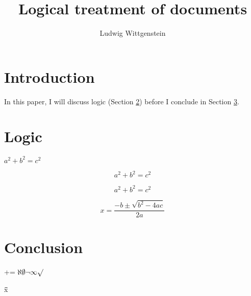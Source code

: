 \documentclass[output=paper]{langscibook}
\title{Logical treatment of documents}
\author{Ludwig Wittgenstein}
\newcommand{\macronacute}[1]{\={\={\={#1}}}}
\begin{document}
\maketitle


\section{Introduction}
In this paper, I will discuss logic (Section \ref{sec:logic}) before I conclude in Section \ref{sec:conclusion}.

\section{Logic}\label{sec:logic}

$a^2+b^2=c^2$

$$a^2+b^2=c^2$$

\[a^2+b^2=c^2\]

$$ x= \frac{-b\pm\sqrt{b^2-4ac}}{2a} $$
\section{Conclusion}\label{sec:conclusion}

\textonehalf+\textonequarter=\textthreequarters
$
\aleph     \emptyset   \neg    \infty  \surd
$
 

\macronacute{x}
\end{document}
